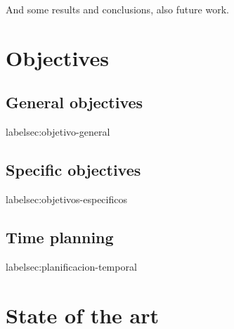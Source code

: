 \documentclass[a4paper, 12pt]{book}
\begin{document}
And some results and conclusions, also future work.



\cleardoublepage
\chapter{Objectives}
\label{chap:objetivos}

\section{General objectives}
label{sec:objetivo-general}


\section{Specific objectives}
label{sec:objetivos-especificos}


\section{Time planning}
label{sec:planificacion-temporal}




\cleardoublepage
\chapter{State of the art}


\end{document}
